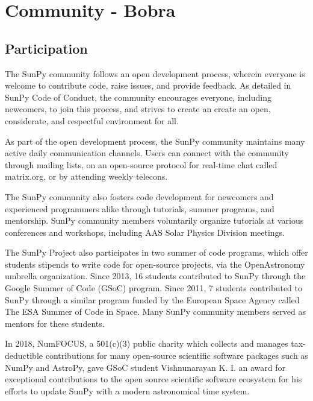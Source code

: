 \section{Community - Bobra}


\subsection{Participation}
The SunPy community follows an open development process, wherein everyone is welcome to contribute code, raise issues, and provide feedback. As detailed in SunPy Code of Conduct, the community encourages everyone, including newcomers, to join this process, and strives to create an create an open, considerate, and respectful environment for all. 

As part of the open development process, the SunPy community maintains many active daily communication channels. Users can connect with the community through mailing lists, on an open-source protocol for real-time chat called matrix.org, or by attending weekly telecons.

The SunPy community also fosters code development for newcomers and experienced programmers alike through tutorials, summer programs, and mentorship. SunPy community members voluntarily organize tutorials at various conferences and workshops, including AAS Solar Physics Division meetings. 

The SunPy Project also participates in two summer of code programs, which offer students stipends to write code for open-source projects, via the OpenAstronomy umbrella organization. Since 2013, 16 students contributed to SunPy through the Google Summer of Code (GSoC) program. Since 2011, 7 students contributed to SunPy through a similar program funded by the European Space Agency called The ESA Summer of Code in Space. Many SunPy community members served as mentors for these students. 

In 2018, NumFOCUS, a 501(c)(3) public charity which collects and manages tax-deductible contributions for many open-source scientific software packages such as NumPy and AstroPy, gave GSoC student Vishnunarayan K. I. an award for exceptional contributions to the open source scientific software ecosystem for his efforts to update SunPy with a modern astronomical time system.

